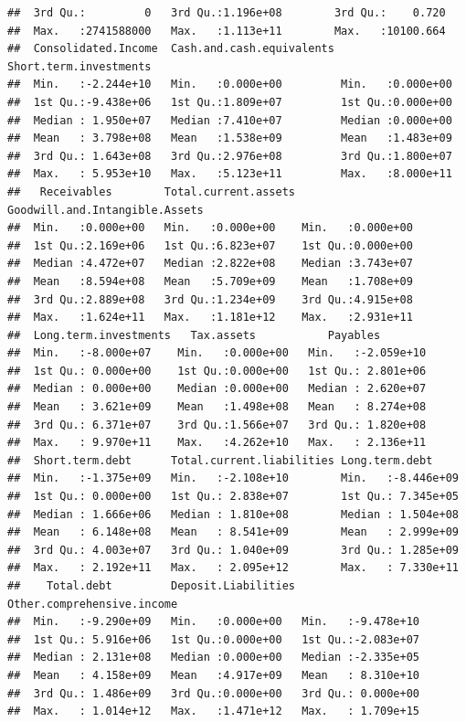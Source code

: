 \documentclass[11pt,]{article}
\begin{document}
\begin{verbatim}
##  3rd Qu.:         0   3rd Qu.:1.196e+08        3rd Qu.:    0.720  
##  Max.   :2741588000   Max.   :1.113e+11        Max.   :10100.664  
##  Consolidated.Income  Cash.and.cash.equivalents Short.term.investments
##  Min.   :-2.244e+10   Min.   :0.000e+00         Min.   :0.000e+00     
##  1st Qu.:-9.438e+06   1st Qu.:1.809e+07         1st Qu.:0.000e+00     
##  Median : 1.950e+07   Median :7.410e+07         Median :0.000e+00     
##  Mean   : 3.798e+08   Mean   :1.538e+09         Mean   :1.483e+09     
##  3rd Qu.: 1.643e+08   3rd Qu.:2.976e+08         3rd Qu.:1.800e+07     
##  Max.   : 5.953e+10   Max.   :5.123e+11         Max.   :8.000e+11     
##   Receivables        Total.current.assets Goodwill.and.Intangible.Assets
##  Min.   :0.000e+00   Min.   :0.000e+00    Min.   :0.000e+00             
##  1st Qu.:2.169e+06   1st Qu.:6.823e+07    1st Qu.:0.000e+00             
##  Median :4.472e+07   Median :2.822e+08    Median :3.743e+07             
##  Mean   :8.594e+08   Mean   :5.709e+09    Mean   :1.708e+09             
##  3rd Qu.:2.889e+08   3rd Qu.:1.234e+09    3rd Qu.:4.915e+08             
##  Max.   :1.624e+11   Max.   :1.181e+12    Max.   :2.931e+11             
##  Long.term.investments   Tax.assets           Payables         
##  Min.   :-8.000e+07    Min.   :0.000e+00   Min.   :-2.059e+10  
##  1st Qu.: 0.000e+00    1st Qu.:0.000e+00   1st Qu.: 2.801e+06  
##  Median : 0.000e+00    Median :0.000e+00   Median : 2.620e+07  
##  Mean   : 3.621e+09    Mean   :1.498e+08   Mean   : 8.274e+08  
##  3rd Qu.: 6.371e+07    3rd Qu.:1.566e+07   3rd Qu.: 1.820e+08  
##  Max.   : 9.970e+11    Max.   :4.262e+10   Max.   : 2.136e+11  
##  Short.term.debt      Total.current.liabilities Long.term.debt      
##  Min.   :-1.375e+09   Min.   :-2.108e+10        Min.   :-8.446e+09  
##  1st Qu.: 0.000e+00   1st Qu.: 2.838e+07        1st Qu.: 7.345e+05  
##  Median : 1.666e+06   Median : 1.810e+08        Median : 1.504e+08  
##  Mean   : 6.148e+08   Mean   : 8.541e+09        Mean   : 2.999e+09  
##  3rd Qu.: 4.003e+07   3rd Qu.: 1.040e+09        3rd Qu.: 1.285e+09  
##  Max.   : 2.192e+11   Max.   : 2.095e+12        Max.   : 7.330e+11  
##    Total.debt         Deposit.Liabilities Other.comprehensive.income
##  Min.   :-9.290e+09   Min.   :0.000e+00   Min.   :-9.478e+10        
##  1st Qu.: 5.916e+06   1st Qu.:0.000e+00   1st Qu.:-2.083e+07        
##  Median : 2.131e+08   Median :0.000e+00   Median :-2.335e+05        
##  Mean   : 4.158e+09   Mean   :4.917e+09   Mean   : 8.310e+10        
##  3rd Qu.: 1.486e+09   3rd Qu.:0.000e+00   3rd Qu.: 0.000e+00        
##  Max.   : 1.014e+12   Max.   :1.471e+12   Max.   : 1.709e+15        

\end{verbatim}
\end{document}
